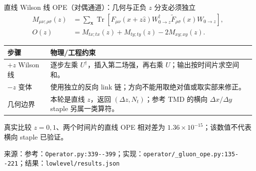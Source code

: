 \documentclass[UTF8,aspectratio=169,11pt]{ctexbeamer}
\newcommand{\source}[1]{\vspace{0.05em}\par{\raggedright\scriptsize\color{muted}来源：#1\par}}
\newcommand{\codepath}[1]{\nolinkurl{#1}}
\begin{document}
\begin{frame}[t]{直线 Wilson 线 OPE（对偶通道）：几何与正负 $z$ 分支必须独立}
  \footnotesize
  \begin{align*}
    M_{\mu\nu;\rho\sigma}(z)&=\sum_{\boldsymbol x}\operatorname{Tr}\!\left[
      F_{\mu\nu}(x+z\hat z)W_{0\to z}^{\dagger}\widetilde F_{\rho\sigma}(x)W_{0\to z}\right],\\
    O(z)&=M_{tx;tx}(z)+M_{ty;ty}(z)-2M_{xy;xy}(z).
  \end{align*}
  \begin{tabularx}{0.96\textwidth}{@{}L Y@{}}
    \toprule
    步骤 & 物理/工程约束\\
    \midrule
    $+z$ Wilson 线 & 逐步左乘 $U^\dagger$，插入第二场强，再右乘 $U$；输出按时间片求空间和。\\
    $-z$ 变体 & 使用独立的反向 link 链；方向不能用取绝对值或取实部来修正。\\
    几何边界 & 本轮是直线 $z$，返回 $(\Delta z,N_t)$；参考 TMD 的横向 $\Delta x/\Delta y$ staple 另属一类算符。\\
    \bottomrule
  \end{tabularx}
  \vspace{0.12em}
  \begin{block}{真实比较}
    $z=0,1$、两个时间片的直线 OPE 相对差为 $1.36\times10^{-15}$；该数值不代表横向 staple 已验证。
  \end{block}
  \source{参考：\codepath{Operator.py:339--399}；实现：\codepath{operator/_gluon_ope.py:135--221}；结果：\codepath{lowlevel/results.json}}
\end{frame}
\end{document}
